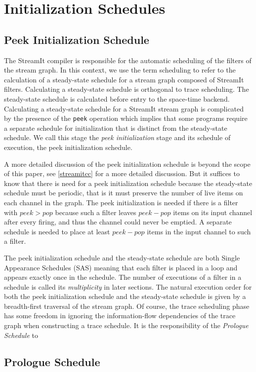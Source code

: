 \section{Initialization Schedules}
\subsection{Peek Initialization Schedule}
The StreamIt compiler is responsible for the automatic scheduling of
the filters of the stream graph. In this context, we use the term
scheduling to refer to the calculation of a steady-state schedule for
a stream graph composed of StreamIt filters.  Calculating a
steady-state schedule is orthogonal to trace scheduling. The
steady-state schedule is calculated before entry to the space-time
backend.  Calculating a steady-state schedule for a StreamIt stream
graph is complicated by the presence of the {\tt peek} operation which
implies that some programs require a separate schedule for
initialization that is distinct from the steady-state schedule.  We
call this stage the {\it peek initialization} stage and its schedule
of execution, the {peek initialization schedule}.

A more detailed discussion of the peek initialization schedule is
beyond the scope of this paper, see \ref{streamitcc} for a more
detailed discussion.  But it suffices to know that there is
need for a peek initialization schedule because the steady-state schedule
must be periodic, that is it must preserve the number of live items on
each channel in the graph.  The peek initialization is needed if there
is a filter with $peek > pop$ because such a filter leaves $peek -
pop$ items on its input channel after every firing, and thus the
channel could never be emptied.  A separate schedule is needed to
place at least $peek - pop$ items in the input channel to such a filter.

The peek initialization schedule and the steady-state schedule are
both Single Appearance Schedules (SAS) meaning that each filter is
placed in a loop and appears exactly once in the schedule.  The number
of executions of a filter in a schedule is called its {\it
multiplicity} in later sections.  The natural execution order for both
the peek initialization schedule and the steady-state schedule is
given by a breadth-first traversal of the stream graph. Of course, the
trace scheduling phase has some freedom in ignoring the
information-flow dependencies of the trace graph when constructing a
trace schedule.  It is the responsibility of the {\it Prologue
Schedule} to 

\subsection{Prologue Schedule}
